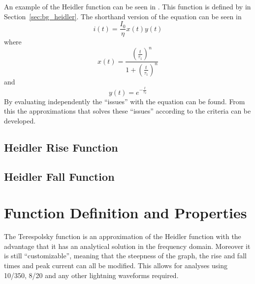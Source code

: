 An example of the Heidler function can be seen in . This function is defined by  in Section~\ref{sec:bg_heidler}.
The shorthand version of the equation can be seen in 
\begin{equation}
i(t) = \frac{I_0}{\eta} x \left( t \right) y \left( t \right)
\label{eqn:HFsmall}
\end{equation}
where
\begin{equation}
	x \left( t \right) = \frac{\left (\frac{t}{\tau_1} \right )^n}{1 + \left (\frac{t}{\tau_1} \right )^n}
	\label{eqn:HFrise}
\end{equation}
and
\begin{equation}
	y \left( t \right) = e^{-\frac{t}{\tau_2}}
	\label{eqn:HFfall}
\end{equation}
By evaluating  independently the ``issues'' with the equation can be found. From this the approximations that solves these ``issues'' according to the criteria can be developed.

\subsection{Heidler Rise Function}
\label{sub:heidler_rise_function}



\subsection{Heidler Fall Function}
\label{sub:heidler_fall_function}



\section{Function Definition and Properties}
\label{sec:function_definition_and_properties}

The Terespolsky function is an approximation of the Heidler function with the advantage that it has an analytical solution in the frequency domain. Moreover it is still ``customizable'', meaning that the steepness of the graph, the rise and fall times and peak current can all be modified. This allows for analyses using 10/350, 8/20 and any other lightning waveforms required.

